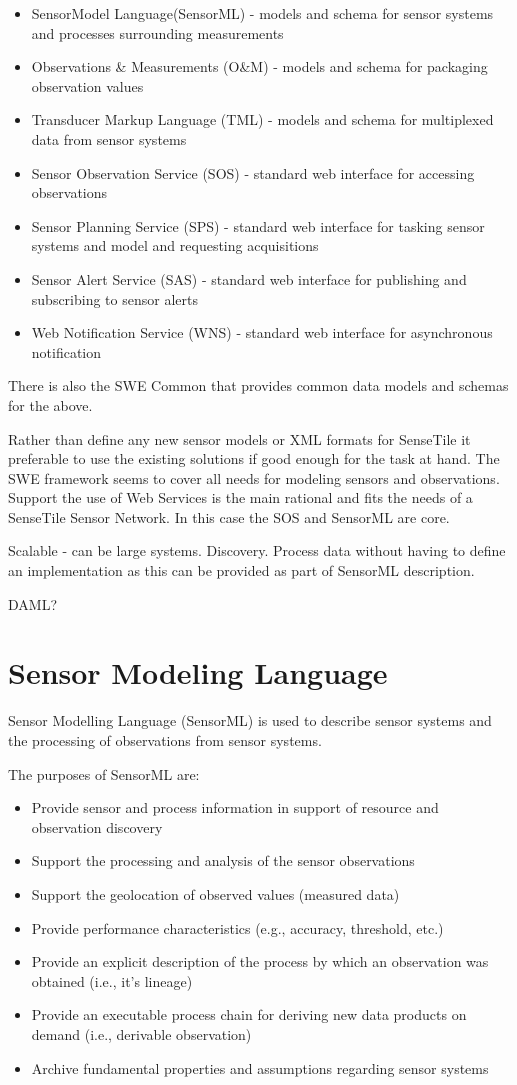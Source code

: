 \documentclass[]{final_report}
\begin{document}
\begin{itemize}
\item  SensorModel Language(SensorML) - models and schema for sensor systems and processes surrounding measurements
\item  Observations \& Measurements (O\&M) - models and schema for packaging observation values
\item  Transducer Markup Language (TML) - models and schema for multiplexed data from sensor systems
\item  Sensor Observation Service (SOS) - standard web interface for accessing observations
\item  Sensor Planning Service (SPS) - standard web interface for tasking sensor systems and model and requesting acquisitions
\item   Sensor Alert Service (SAS) - standard web interface for publishing and subscribing to sensor alerts
\item   Web Notification Service (WNS) - standard web interface for asynchronous notification
\end{itemize}
There is also the SWE Common that provides common data models and schemas for the above.

Rather than define any new sensor models or XML formats for SenseTile it preferable to use the existing solutions if good enough for the task at hand. The SWE framework seems to cover all needs for modeling sensors and observations. Support the use of Web Services is the main rational and fits the needs of a SenseTile Sensor Network. In this case the SOS and SensorML are core.

Scalable - can be  large systems. Discovery. Process data without having to define an implementation as this
can be provided as part of SensorML description.

 DAML?

\section{Sensor Modeling Language}
Sensor Modelling Language (SensorML) is used to describe sensor systems and the processing of observations from sensor systems.

The purposes of SensorML are:
\begin{itemize}
\item Provide sensor and process information in support of resource and observation discovery
\item Support the processing and analysis of the sensor observations
\item Support the geolocation of observed values (measured data)
\item Provide performance characteristics (e.g., accuracy, threshold, etc.)
\item Provide an explicit description of the process by which an observation was obtained (i.e., it’s lineage)
\item Provide an executable process chain for deriving new data products on demand (i.e., derivable observation)
\item Archive fundamental properties and assumptions regarding sensor systems
\end{itemize}
\end{document}
